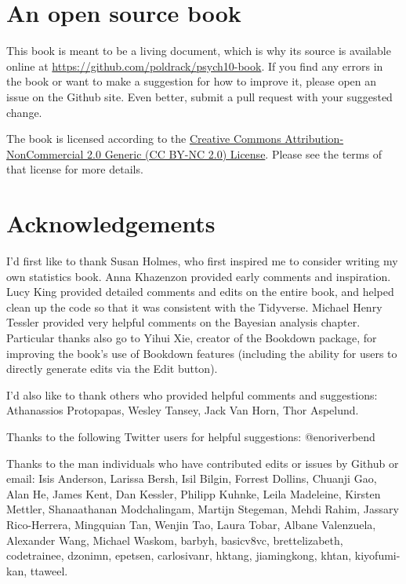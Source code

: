 \documentclass[12pt,]{book}
\begin{document}
\hypertarget{an-open-source-book}{%
\section{An open source book}\label{an-open-source-book}}

This book is meant to be a living document, which is why its source is available online at \url{https://github.com/poldrack/psych10-book}. If you find any errors in the book or want to make a suggestion for how to improve it, please open an issue on the Github site. Even better, submit a pull request with your suggested change.

The book is licensed according to the \href{https://creativecommons.org/licenses/by-nc/2.0/}{Creative Commons Attribution-NonCommercial 2.0 Generic (CC BY-NC 2.0) License}. Please see the terms of that license for more details.

\hypertarget{acknowledgements}{%
\section{Acknowledgements}\label{acknowledgements}}

I'd first like to thank Susan Holmes, who first inspired me to consider writing my own statistics book. Anna Khazenzon provided early comments and inspiration. Lucy King provided detailed comments and edits on the entire book, and helped clean up the code so that it was consistent with the Tidyverse. Michael Henry Tessler provided very helpful comments on the Bayesian analysis chapter. Particular thanks also go to Yihui Xie, creator of the Bookdown package, for improving the book's use of Bookdown features (including the ability for users to directly generate edits via the Edit button).

I'd also like to thank others who provided helpful comments and suggestions: Athanassios Protopapas, Wesley Tansey, Jack Van Horn, Thor Aspelund.

Thanks to the following Twitter users for helpful suggestions: @enoriverbend

Thanks to the man individuals who have contributed edits or issues by Github or email:
Isis Anderson, Larissa Bersh, Isil Bilgin, Forrest Dollins, Chuanji Gao, Alan He, James Kent, Dan Kessler, Philipp Kuhnke, Leila Madeleine, Kirsten Mettler, Shanaathanan Modchalingam, Martijn Stegeman, Mehdi Rahim, Jassary Rico-Herrera, Mingquian Tan, Wenjin Tao, Laura Tobar, Albane Valenzuela, Alexander Wang, Michael Waskom,
barbyh, basicv8vc, brettelizabeth, codetrainee, dzonimn, epetsen, carlosivanr, hktang, jiamingkong, khtan, kiyofumi-kan, ttaweel.
\end{document}
